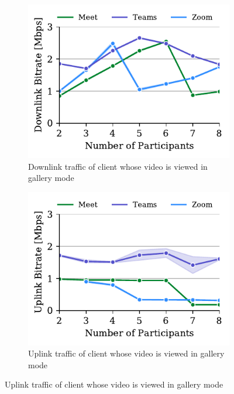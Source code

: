 
\begin{figure}[ht]
\begin{subfigure}[t]{.33\textwidth}
  \centering
   \captionsetup{width=.9\linewidth}
    \includegraphics[width=1\textwidth,keepaspectratio]{../figures/modality/speaker_recv.pdf}
    \caption{Downlink traffic of client whose video is viewed in gallery mode}
    \label{fig:gallery-recv}
\end{subfigure}
\hfill
\begin{subfigure}[t]{.33\textwidth}
  \centering
   \captionsetup{width=.9\linewidth}
    \includegraphics[width=1\textwidth,keepaspectratio]{../figures/modality/gallery_send.pdf}
    \caption{Uplink traffic of client whose video is viewed in gallery mode}

\end{subfigure}
\end{figure}
